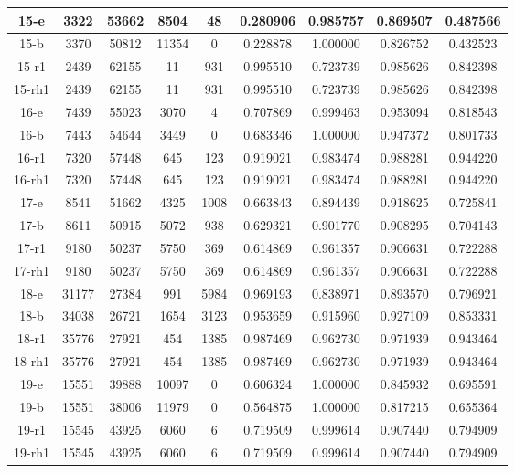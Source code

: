 \begin{longtable}[!h]{|c|c|c|c|c|c|c|c|c|}
	\hline	15-e	&	3322	&	53662	&	8504	&	48	&	0.280906	&	0.985757	&	0.869507	&	0.487566	\\
	\hline \rowcolor{bad}	15-b	&	3370	&	50812	&	11354	&	0	&	0.228878	&	1.000000	&	0.826752	&	0.432523	\\
	\hline \rowcolor{closest}	15-r1	&	2439	&	62155	&	11	&	931	&	0.995510	&	0.723739	&	0.985626	&	0.842398	\\
	\hline \rowcolor{closest}	15-rh1	&	2439	&	62155	&	11	&	931	&	0.995510	&	0.723739	&	0.985626	&	0.842398	\\
	
	\hline	16-e	&	7439	&	55023	&	3070	&	4	&	0.707869	&	0.999463	&	0.953094	&	0.818543	\\
	\hline \rowcolor{bad}	16-b	&	7443	&	54644	&	3449	&	0	&	0.683346	&	1.000000	&	0.947372	&	0.801733	\\
	\hline \rowcolor{closest}	16-r1	&	7320	&	57448	&	645	&	123	&	0.919021	&	0.983474	&	0.988281	&	0.944220	\\
	\hline \rowcolor{closest}	16-rh1	&	7320	&	57448	&	645	&	123	&	0.919021	&	0.983474	&	0.988281	&	0.944220	\\
	
	\hline \rowcolor{closest}	17-e	&	8541	&	51662	&	4325	&	1008	&	0.663843	&	0.894439	&	0.918625	&	0.725841	\\
	\hline \rowcolor{bad}	17-b	&	8611	&	50915	&	5072	&	938	&	0.629321	&	0.901770	&	0.908295	&	0.704143	\\
	\hline	17-r1	&	9180	&	50237	&	5750	&	369	&	0.614869	&	0.961357	&	0.906631	&	0.722288	\\
	\hline	17-rh1	&	9180	&	50237	&	5750	&	369	&	0.614869	&	0.961357	&	0.906631	&	0.722288	\\
	
	\hline \rowcolor{bad}	18-e	&	31177	&	27384	&	991	&	5984	&	0.969193	&	0.838971	&	0.893570	&	0.796921	\\
	\hline	18-b	&	34038	&	26721	&	1654	&	3123	&	0.953659	&	0.915960	&	0.927109	&	0.853331	\\
	\hline \rowcolor{closest}	18-r1	&	35776	&	27921	&	454	&	1385	&	0.987469	&	0.962730	&	0.971939	&	0.943464	\\
	\hline \rowcolor{closest}	18-rh1	&	35776	&	27921	&	454	&	1385	&	0.987469	&	0.962730	&	0.971939	&	0.943464	\\
	
	\hline	19-e	&	15551	&	39888	&	10097	&	0	&	0.606324	&	1.000000	&	0.845932	&	0.695591	\\
	\hline \rowcolor{bad}	19-b	&	15551	&	38006	&	11979	&	0	&	0.564875	&	1.000000	&	0.817215	&	0.655364	\\
	\hline \rowcolor{closest}	19-r1	&	15545	&	43925	&	6060	&	6	&	0.719509	&	0.999614	&	0.907440	&	0.794909	\\
	\hline \rowcolor{closest}	19-rh1	&	15545	&	43925	&	6060	&	6	&	0.719509	&	0.999614	&	0.907440	&	0.794909	\\
	

\end{longtable}
